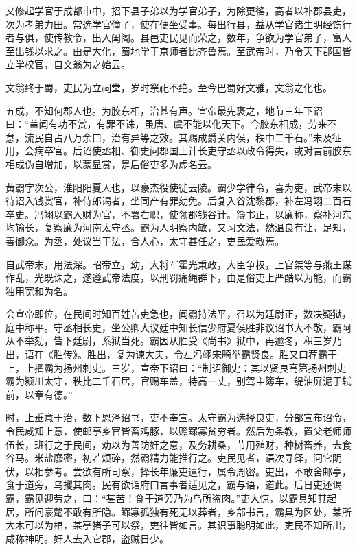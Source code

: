 \documentclass[12pt,UTF8]{ctexbook}
\begin{document}
又修起学官于成都市中，招下县子弟以为学官弟子，为除更徭，高者以补郡县吏，次为孝弟力田。常选学官僮子，使在便坐受事。每出行县，益从学官诸生明经饬行者与俱，使传教令，出入闺阁。县邑吏民见而荣之，数年，争欲为学官弟子，富人至出钱以求之。由是大化，蜀地学于京师者比齐鲁焉。至武帝时，乃令天下郡国皆立学校官，自文翁为之始云。



文翁终于蜀，吏民为立祠堂，岁时祭祀不绝。至今巴蜀好文雅，文翁之化也。



五成，不知何郡人也。为胶东相，治甚有声。宣帝最先褒之，地节三年下诏曰：“盖闻有功不赏，有罪不诛，虽唐、虞不能以化天下。今胶东相成，劳来不怠，流民自占八万余口，治有异等之效。其赐成爵关内侯，秩中二千石。”未及征用，会病卒官。后诏使丞相、御史问郡国上计长吏守丞以政令得失，或对言前胶东相成伪自增加，以蒙显赏，是后俗吏多为虚名云。



黄霸字次公，淮阳阳夏人也，以豪杰役使徙云陵。霸少学律令，喜为吏，武帝末以待诏入钱赏官，补侍郎谒者，坐同产有罪劾免。后复入谷沈黎郡，补左冯翊二百石卒史。冯翊以霸入财为官，不署右职，使领郡钱谷计。簿书正，以廉称，察补河东均输长，复察廉为河南太守丞。霸为人明察内敏，又习文法，然温良有让，足知，善御众。为丞，处议当于法，合人心，太守甚任之，吏民爱敬焉。



自武帝末，用法深。昭帝立，幼，大将军霍光秉政，大臣争权，上官桀等与燕王谋作乱，光既诛之，遂遵武帝法度，以刑罚痛绳群下，由是俗吏上严酷以为能，而霸独用宽和为名。



会宣帝即位，在民间时知百姓苦吏急也，闻霸持法平，召以为廷尉正，数决疑狱，庭中称平。守丞相长史，坐公卿大议廷中知长信少府夏侯胜非议诏书大不敬，霸阿从不举劾，皆下廷尉，系狱当死。霸因从胜受《尚书》狱中，再逾冬，积三岁乃出，语在《胜传》。胜出，复为谏大夫，令左冯翊宋畸举霸贤良。胜又口荐霸于上，上擢霸为扬州刺史。三岁，宣帝下诏曰：“制诏御史：其以贤良高第扬州刺史霸为颍川太守，秩比二千石居，官赐车盖，特高一丈，别驾主簿车，缇油屏泥于轼前，以章有德。”



时，上垂意于治，数下恩泽诏书，吏不奉宣。太守霸为选择良吏，分部宣布诏令，令民咸知上意，使邮亭乡官皆畜鸡豚，以赡鳏寡贫穷者。然后为条教，置父老师师伍长，班行之于民间，劝以为善防奸之意，及务耕桑，节用殖财，种树畜养，去食谷马。米盐靡密，初若烦碎，然霸精力能推行之。吏民见者，语次寻绎，问它阴伏，以相参考。尝欲有所司察，择长年廉吏遣行，属令周密。吏出，不敢舍邮亭，食于道旁，乌攫其肉。民有欲诣府口言事者适见之，霸与语，道此。后日吏还谒霸，霸见迎劳之，曰：“甚苦！食于道旁乃为乌所盗肉。”吏大惊，以霸具知其起居，所问豪氂不敢有所隐。鳏寡孤独有死无以葬者，乡部书言，霸具为区处，某所大木可以为棺，某亭猪子可以祭，吏往皆如言。其识事聪明如此，吏民不知所出，咸称神明。奸人去入它郡，盗贼日少。
\end{document}
